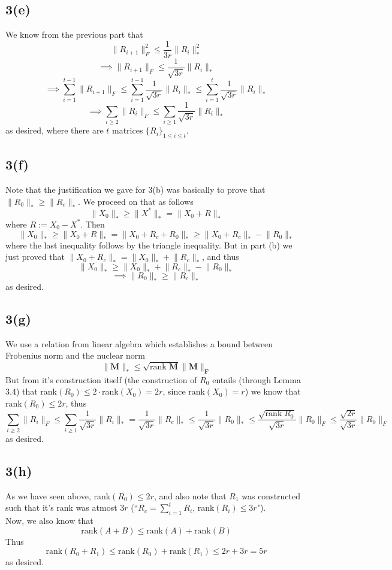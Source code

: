 \documentclass[a4paper,14pt]{article}
\numberwithin{definition}{section}
\numberwithin{mytheorem}{subsection}
\begin{document}
\subsection{3(e)}
We know from the previous part that
$$\lVert R_{i+1}\rVert^2_F \leq \frac{1}{3r}\lVert R_i\rVert_*^2$$
$$\implies \lVert R_{i+1}\rVert_F \leq \frac{1}{\sqrt{3r}}\lVert R_i\rVert_*$$
$$\implies \sum^{t-1}_{i = 1}\lVert R_{i+1}\rVert_F \leq \sum^{t-1}_{i = 1}\frac{1}{\sqrt{3r}}\lVert R_i\rVert_*\leq \sum^{t}_{i = 1}\frac{1}{\sqrt{3r}}\lVert R_i\rVert_*$$
$$\implies \sum_{i \geq 2}\lVert R_{i}\rVert_F \leq\sum_{i \geq 1}\frac{1}{\sqrt{3r}}\lVert R_i\rVert_*$$
as desired, where there are $t$ matrices $\{R_i\}_{1\leq i\leq t}$.
\subsection{3(f)}
Note that the justification we gave for 3(b) was basically to prove that $\lVert R_0\rVert_* \geq \lVert R_c\rVert_*$. We proceed on that as follows
$$\lVert X_0\rVert_* \geq \lVert X^*\rVert_* = \lVert X_0 + R\rVert_*$$
where $R := X_0 - X^*$. Then
$$\lVert X_0\rVert_* \geq \lVert X_0 + R\rVert_* = \lVert X_0 + R_c + R_0\rVert_* \geq \lVert X_0 + R_c\rVert_* - \lVert R_0\rVert_*$$
where the last inequality follows by the triangle inequality. But in part (b) we just proved that $\lVert X_0 + R_c\rVert_* = \lVert X_0\rVert_* + \lVert R_c\rVert_*$, and thus
$$\lVert X_0\rVert_* \geq \lVert X_0\rVert_* + \lVert R_c\rVert_* - \lVert R_0\rVert_*$$
$$\implies \lVert R_0\rVert_* \geq \lVert R_c\rVert_*$$
as desired.
\subsection{3(g)}
We use a relation from linear algebra which establishes a bound between Frobenius norm and the nuclear norm
$$\boldsymbol{\lVert M\rVert_* \leq \sqrt{\mathrm{rank}\;M}\lVert M\rVert_F}$$
But from it's construction itself (the construction of $R_0$ entails (through Lemma 3.4) that rank$(R_0)\leq 2\cdot$rank$(X_0) = 2r$, since rank$(X_0) = r$) we know that rank$(R_0)\leq 2r$, thus
$$\sum_{i \geq 2}\lVert R_{i}\rVert_F \leq\sum_{i \geq 1}\frac{1}{\sqrt{3r}}\lVert R_i\rVert_* = \frac{1}{\sqrt{3r}}\lVert R_c\rVert_* \leq \frac{1}{\sqrt{3r}}\lVert R_0\rVert_* \leq \frac{\sqrt{\mathrm{rank}\;R_0}}{\sqrt{3r}}\lVert R_0\rVert_F\leq \frac{\sqrt{2r}}{\sqrt{3r}}\lVert R_0\rVert_F$$
as desired.
\subsection{3(h)}
As we have seen above, rank$(R_0)\leq 2r$, and also note that $R_1$ was constructed such that it's rank was atmost 3$r$ (``$R_c = \sum^{t}_{i = 1}R_i$, rank$(R_i)\leq 3r$").\\
Now, we also know that 
$$\mathrm{rank}(A+B)\leq\mathrm{rank}(A) + \mathrm{rank}(B)$$
Thus
$$\mathrm{rank}(R_0 + R_1)\leq\mathrm{rank}(R_0) + \mathrm{rank}(R_1) \leq 2r + 3r = 5r$$
as desired.
\end{document}
